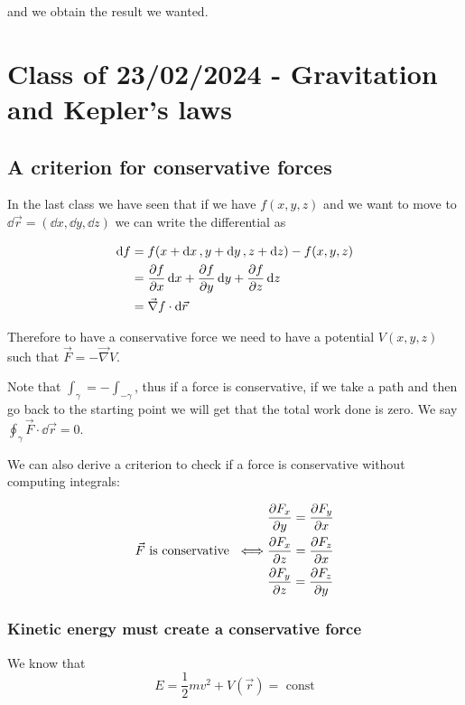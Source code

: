 \documentclass[10pt]{extarticle}
\begin{document}
and we obtain the result we wanted.

\section{Class of 23/02/2024 - Gravitation and Kepler's laws}

\subsection{A criterion for conservative forces}

In the last class we have seen that if we have $f(x, y, z)$ and we want to move to $\dd{\vec r} = (\dd{x}, \dd{y}, \dd{z})$ we can write the differential as

\begin{align*}
    \dd{f} & = f(x + \dd{x}, y + \dd{y}, z + \dd{z}) - f(x, y, z)        \\
           & = \pdv{f}{x} \dd{x} + \pdv{f}{y} \dd{y} + \pdv{f}{z} \dd{z} \\
           & = \vec{\nabla} f \cdot \dd{\vec{r}}
\end{align*}

Therefore to have a conservative force we need to have a potential $V(x, y, z)$ such that $\vec{F} = -\vec{\nabla} V$.

Note that $\int_\gamma = -\int_{-\gamma}$, thus if a force is conservative, if we take a path and then go back to the starting point we will get that the total work done is zero. We say $\oint_\gamma \vec{F} \cdot \dd{\vec{r}} = 0$.

We can also derive a criterion to check if a force is conservative without computing integrals:

\begin{align*}
                                          & \pdv{F_x}{y} = \pdv{F_y}{x} \\
    \vec{F} \text{ is conservative } \iff & \pdv{F_x}{z} = \pdv{F_z}{x} \\
                                          & \pdv{F_y}{z} = \pdv{F_z}{y}
\end{align*}

\subsubsection{Kinetic energy must create a conservative force}

We know that
$$
    E = \frac{1}{2} m v^2 + V(\vec{r}) = \text{ const}
$$
\end{document}
